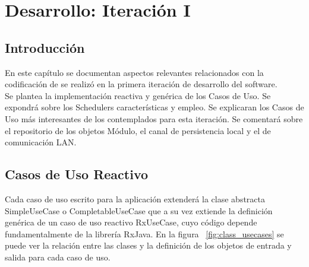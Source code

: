 
\chapter{Desarrollo: Iteración I} %

\label{Chapter6} %


\section{Introducción}

En este capítulo se documentan aspectos relevantes relacionados con la codificación de se realizó en la primera iteración de desarrollo del software.\\
Se plantea la implementación reactiva y genérica de los Casos de Uso. Se expondrá sobre los Schedulers características y empleo.
Se explicaran los Casos de Uso más interesantes de los contemplados para esta iteración.
Se comentará sobre el repositorio de los objetos Módulo, el canal de persistencia local y el de comunicación LAN.

\section{Casos de Uso Reactivo}
Cada caso de uso escrito para la aplicación extenderá la clase abstracta SimpleUseCase o CompletableUseCase que a su vez extiende la definición genérica de un caso de uso reactivo RxUseCase, cuyo código depende fundamentalmente de la librería RxJava.
En la figura ~\ref{fig:class_usecases} se puede ver la relación entre las clases y la definición de los objetos de entrada y salida para cada caso de uso.

